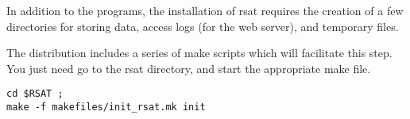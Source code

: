 \documentclass[12pt,a4paper, oneside]{scrreprt} %
\begin{document}
In addition to the programs, the installation of rsat requires
the creation of a few directories for storing data, access logs (for
the web server), and temporary files.

The distribution includes a series of make scripts which will
facilitate this step. You just need go to the rsat directory, and
start the appropriate make file.

\begin{lstlisting}
cd $RSAT ; 
make -f makefiles/init_rsat.mk init
\end{lstlisting}












\end{document}
